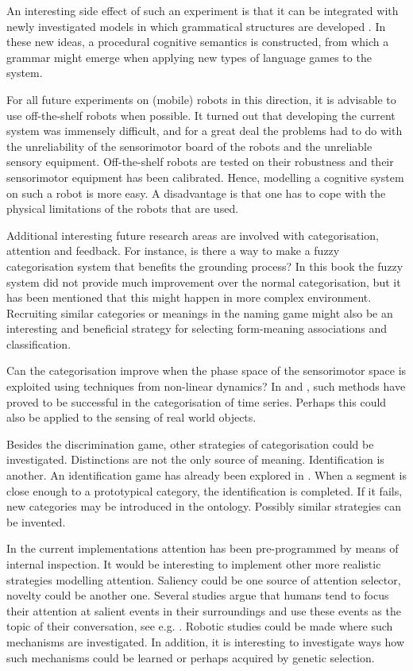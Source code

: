 \enlargethispage{1\baselineskip}
An interesting side effect of such an experiment is that it can be integrated with newly investigated models in which grammatical structures are developed \citep{steels:2000a}. In these new ideas, a procedural cognitive semantics is constructed, from which a grammar might emerge when applying new types of language games to the system.

For all future experiments on (mobile) robots in this direction, it is advisable to use off-the-shelf robots when possible. It turned out that developing the current system was immensely difficult, and for a great deal the problems had to do with the unreliability of the sensorimotor board of the robots and the unreliable sensory equipment. Off-the-shelf robots are tested on their robustness and their sensorimotor equipment has been calibrated. Hence, modelling a cognitive system on such a robot is more easy. A disadvantage is that one has to cope with the physical limitations of the robots that are used.


Additional interesting future research areas are involved with categorisation, attention and feedback. For instance, is there a way to make a fuzzy categorisation system that benefits the grounding process? In this book the fuzzy system did not provide much improvement over the normal categorisation, but it has been mentioned that this might happen in more complex environment. Recruiting similar categories or meanings in the naming game \citep{kaplan:2000} might also be an interesting and beneficial strategy for selecting form-meaning associations and classification.

Can the categorisation improve when the phase space of the sensorimotor space is exploited using techniques from non-linear dynamics? In \citet{rosenstein:1998a} and \citet{vogt:1999a}, such methods have proved to be successful in the categorisation of time series. Perhaps this could also be applied to the sensing of real world objects. 

Besides the discrimination game, other strategies of categorisation could be investigated. Distinctions are not the only source of meaning. Identification is another. An identification game has already been explored in \citet{vogt:1999a,vogt:2000}. When a segment is close enough to a prototypical category, the identification is completed. If it fails, new categories may be introduced in the ontology. Possibly similar strategies can be invented.


In the current implementations attention has been pre-programmed by means of internal inspection. It would be interesting to implement other more realistic strategies modelling attention. Saliency could be one source of attention selector, novelty could be another one. Several studies argue that humans tend to focus their attention at salient events in their surroundings and use these events as the topic of their conversation, see e.g. \citealt{dessalles:2000}. Robotic studies could be made where such mechanisms are investigated. In addition, it is interesting to investigate ways how such mechanisms could be learned or perhaps acquired by genetic selection. 

